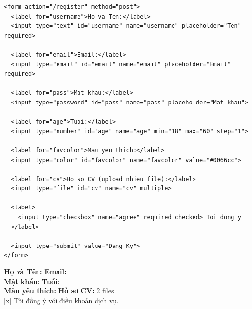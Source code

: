 \documentclass[11pt,oneside]{book}
\begin{document}
\begin{codeWindow}
\begin{lstlisting}[language=HTML5]
<form action="/register" method="post">
  <label for="username">Ho va Ten:</label>
  <input type="text" id="username" name="username" placeholder="Ten" required>
  
  <label for="email">Email:</label>
  <input type="email" id="email" name="email" placeholder="Email" required>
  
  <label for="pass">Mat khau:</label>
  <input type="password" id="pass" name="pass" placeholder="Mat khau">
  
  <label for="age">Tuoi:</label>
  <input type="number" id="age" name="age" min="18" max="60" step="1">
  
  <label for="favcolor">Mau yeu thich:</label>
  <input type="color" id="favcolor" name="favcolor" value="#0066cc">
  
  <label for="cv">Ho so CV (upload nhieu file):</label>
  <input type="file" id="cv" name="cv" multiple>
  
  <label>
    <input type="checkbox" name="agree" required checked> Toi dong y
  </label>
  
  <input type="submit" value="Dang Ky">
</form>
\end{lstlisting}
\end{codeWindow}

\begin{browserWindow}
\sffamily\small
\begin{tcolorbox}[colback=white, colframe=primaryBlue!20, arc=4pt, boxrule=0.6pt, left=8pt, right=8pt, top=8pt, bottom=8pt]
  \textbf{Họ và Tên:} \; \tcbox[on line, arc=3pt, colback=codeBg, colframe=codeBorder, boxsep=2pt, left=6pt, right=20pt]{\textcolor{darkText}{Nguyễn Văn A}} \qquad
  \textbf{Email:} \; \tcbox[on line, arc=3pt, colback=codeBg, colframe=codeBorder, boxsep=2pt, left=6pt, right=20pt]{\textcolor{darkText}{a@example.com}} \\[6pt]
  \textbf{Mật khẩu:} \; \tcbox[on line, arc=3pt, colback=codeBg, colframe=codeBorder, boxsep=2pt, left=6pt, right=20pt]{\textcolor{darkText}{$\bullet\bullet\bullet\bullet\bullet\bullet$}} \qquad
  \textbf{Tuổi:} \;  \\[6pt]
  \textbf{Màu yêu thích:} \;  \qquad
  \textbf{Hồ sơ CV:} \;  \; \textcolor{codeComment}{2 files} \\[8pt]
  [x] Tôi đồng ý với điều khoản dịch vụ. \\[10pt]
\end{tcolorbox}
\end{browserWindow}
\end{document}
